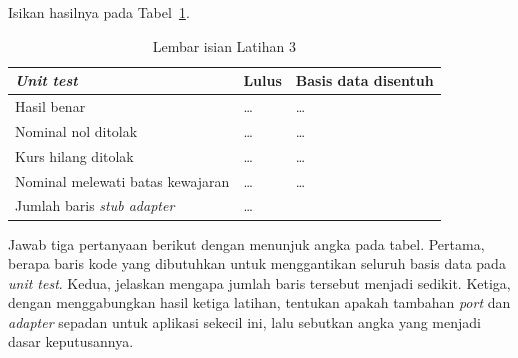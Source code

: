 Isikan hasilnya pada Tabel~\ref{tab:lat3port-hasil}.

\begin{table}[htbp]
  \centering
  \caption{Lembar isian Latihan 3}
  \label{tab:lat3port-hasil}
  \begin{tabularx}{\textwidth}{|X|l|l|}
    \hline
    \textbf{\textit{Unit test}} & \textbf{Lulus} & \textbf{Basis data disentuh} \\
    \hline
    Hasil benar & \dots & \dots \\
    \hline
    Nominal nol ditolak & \dots & \dots \\
    \hline
    Kurs hilang ditolak & \dots & \dots \\
    \hline
    Nominal melewati batas kewajaran & \dots & \dots \\
    \hline
    Jumlah baris \textit{stub adapter} & \multicolumn{2}{l|}{\dots} \\
    \hline
  \end{tabularx}
\end{table}

Jawab tiga pertanyaan berikut dengan menunjuk angka pada tabel. Pertama, berapa
baris kode yang dibutuhkan untuk menggantikan seluruh basis data pada
\textit{unit test}. Kedua, jelaskan mengapa jumlah baris tersebut menjadi
sedikit. Ketiga, dengan menggabungkan hasil ketiga latihan, tentukan apakah
tambahan \textit{port} dan \textit{adapter} sepadan untuk aplikasi sekecil ini,
lalu sebutkan angka yang menjadi dasar keputusannya.

